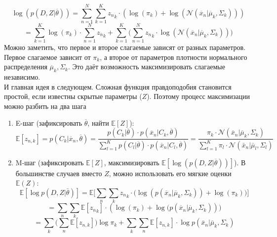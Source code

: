 \[\log(p(D, Z | \overline{\theta})) = \sum\limits_{n=1}^{N}\sum\limits_{k=1}^{K}{z_n}_k \cdot (\log(\pi_k) +  \log(\mathcal{N}(\overline{x}_n|\overline{\mu}_k,\Sigma_k)))\]
\[= \sum\limits_{k=1}^K \log(\pi_k) \cdot \sum\limits_{n=1}^N {z_n}_k + 
\sum\limits_{k=1}^K \big( \sum\limits_{n=1}^N {z_n}_k \cdot \log(\mathcal{N}(\overline{x}_n|\overline{\mu}_k,\Sigma_k)) \big)\]
Можно заметить, что первое и второе слагаемые зависят от разных параметров.
Первое слагаемое зависит от $\pi_k$, а второе от параметров плотности нормального распределения $\overline{\mu}_k, \Sigma_k$. Это даёт возможность максимизировать слагаемые независимо.
\\
И главная идея в следующем. Сложная функция правдоподобия становится простой, если известны скрытые параметры ($Z$). 
Поэтому процесс максимизации можно разбить на два шага 
\begin{enumerate}
    \item E-шаг (зафиксировать $\overline{\theta}$, найти $\mathbb{E}[Z]$):
    \[\mathbb{E}[z_{n, k}] = p(C_k|\overline{x}_n,\overline{\theta}) 
    = \displaystyle \frac{p(C_k|\overline{\theta})\cdot p(\overline{x}_n|C_k,\overline{\theta})}{\sum\limits_{l=1}^K p(C_l|\overline{\theta})\cdot p(\overline{x}_n|C_l,\overline{\theta})}
    = \displaystyle \frac{\pi_k\cdot \mathcal{N}(\bar x_n | \bar \mu_k, \Sigma_k)}{\sum\limits_{l=1}^K \pi_l \cdot \mathcal{N}(\bar x_n | \bar \mu_l, \Sigma_l)}\]
    \item M-шаг (зафиксировать $\mathbb{E}[Z]$, максимизировать $\mathbb{E}[\log(p(D,Z|\overline{\theta}))]$). В большинстве случаев вместо $Z$, можно использовать его мягкие оценки $\mathbb{E}(Z)$:
    \[\mathbb{E}[\log p(D,Z|\bar\theta)] 
    = \mathbb{E}\Big[\sum\limits_n\sum\limits_k {z_n}_k \cdot \big(\log(p(\overline{x}_n|\overline{\mu}_k, \Sigma_k)) + \log(\pi_k)\big)\Big]\] 
    \[ = \sum\limits_n\sum\limits_k\mathbb{E}[{z_n}_k]\cdot(\log(\pi_k) + \log\big(p(\overline{x}_n|\overline{\mu}_k, \Sigma_k)))\]
    \[= \sum\limits_k\Big(\sum\limits_n\mathbb{E}[z_{n,k}]\Big) \log \pi_k + \sum\limits_k\sum\limits_n\mathbb{E}[z_{n,k}]\cdot \log p(\bar x_n|\bar\mu_k,\Sigma_k)\]
\end{enumerate}

